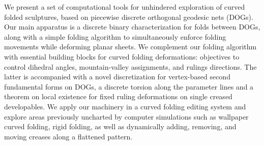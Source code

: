 We present a set of computational tools for unhindered exploration of curved folded sculptures, based on piecewise discrete orthogonal geodesic nets (DOGs). Our main apparatus is a discrete binary characterization for folds between DOGs, along with a simple folding algorithm to simultaneously enforce folding movements while deforming planar sheets. We complement our folding algorithm with essential building blocks for curved folding deformations: objectives to control dihedral angles, mountain-valley assignments, and rulings directions. The latter is accompanied with a novel discretization for vertex-based second fundamental forms on DOGs, a discrete torsion along the parameter lines and a theorem on local existence for fixed ruling deformations on single creased developables. We apply our machinery in a curved folding editing system and explore areas previously uncharted by computer simulations such as wallpaper curved folding, rigid folding, as well as dynamically adding, removing, and moving creases along a flattened pattern.